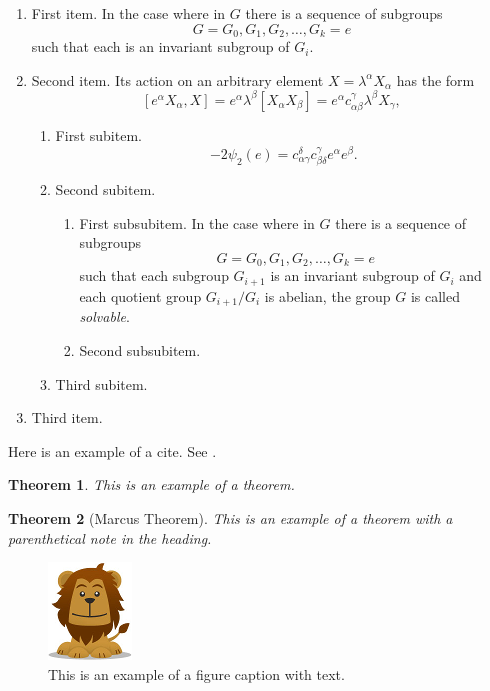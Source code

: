 \documentclass{amsart}
\newtheorem{theorem}{Theorem}[section]
\theoremstyle{definition}
\theoremstyle{remark}
\numberwithin{equation}{section}
\newcommand{\blankbox}[2]{%
  \parbox{\columnwidth}{\centering
    \setlength{\fboxsep}{0pt}%
    \fbox{\raisebox{0pt}[#2]{\hspace{#1}}}%
  }%
}
\begin{document}
\begin{enumerate}
\item First item.
In the case where in $G$ there is a sequence of subgroups
\[
G = G_0, G_1, G_2, \dots, G_k = e
\]
such that each is an invariant subgroup of $G_i$.

\item Second item.
Its action on an arbitrary element $X = \lambda^\alpha X_\alpha$ has the
form
\begin{equation}\label{eq:action}
[e^\alpha X_\alpha, X] = e^\alpha \lambda^\beta
[X_\alpha X_\beta] = e^\alpha c^\gamma_{\alpha \beta}
 \lambda^\beta X_\gamma,
\end{equation}

\begin{enumerate}
\item First subitem.
\[
- 2\psi_2(e) =  c_{\alpha \gamma}^\delta c_{\beta \delta}^\gamma
e^\alpha e^\beta.
\]

\item Second subitem.
\begin{enumerate}
\item First subsubitem.
In the case where in $G$ there is a sequence of subgroups
\[
G = G_0, G_1, G_2, \ldots, G_k = e
\]
such that each subgroup $G_{i+1}$ is an invariant subgroup of $G_i$ and
each quotient group $G_{i+1}/G_{i}$ is abelian, the group $G$ is called
\textit{solvable}.

\item Second subsubitem.
\end{enumerate}
\item Third subitem.
\end{enumerate}
\item Third item.
\end{enumerate}

Here is an example of a cite. See \cite{A}.

\begin{theorem}
This is an example of a theorem.
\end{theorem}

\begin{theorem}[Marcus Theorem]
This is an example of a theorem with a parenthetical note in the
heading.
\end{theorem}

\begin{figure}[tb]
\includegraphics{fig/lion}
\caption{This is an example of a figure caption with text.}
\label{firstfig}
\end{figure}
\end{document}
